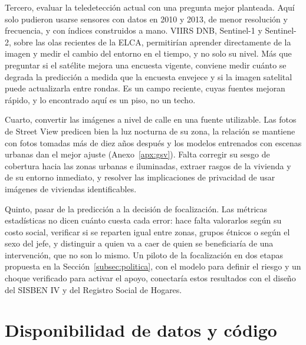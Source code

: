\documentclass[12pt, letterpaper]{article}
\begin{document}
Tercero, evaluar la teledetección actual con una pregunta mejor planteada.
Aquí solo pudieron usarse sensores con datos en 2010 y 2013, de menor
resolución y frecuencia, y con índices construidos a mano. VIIRS DNB,
Sentinel-1 y Sentinel-2, sobre las olas recientes de la ELCA, permitirían
aprender directamente de la imagen y medir el cambio del entorno en el
tiempo, y no solo su nivel. Más que preguntar si el satélite mejora una
encuesta vigente, conviene medir cuánto se degrada la predicción a medida
que la encuesta envejece y si la imagen satelital puede actualizarla entre
rondas. Es un campo reciente, cuyas fuentes mejoran rápido, y lo
encontrado aquí es un piso, no un techo.

Cuarto, convertir las imágenes a nivel de calle en una fuente utilizable.
Las fotos de Street View predicen bien la luz nocturna de su zona, la
relación se mantiene con fotos tomadas más de diez años después y los
modelos entrenados con escenas urbanas dan el mejor ajuste
(Anexo~\ref{apx:gsv}). Falta corregir su sesgo de cobertura hacia las
zonas urbanas e iluminadas, extraer rasgos de la vivienda y de su entorno
inmediato, y resolver las implicaciones de privacidad de usar imágenes de
viviendas identificables.

Quinto, pasar de la predicción a la decisión de focalización. Las métricas
estadísticas no dicen cuánto cuesta cada error: hace falta valorarlos
según su costo social, verificar si se reparten igual entre zonas, grupos
étnicos o según el sexo del jefe, y distinguir a quien va a caer de quien
se beneficiaría de una intervención, que no son lo mismo. Un piloto de la
focalización en dos etapas propuesta en la Sección~\ref{subsec:politica},
con el modelo para definir el riesgo y un choque verificado para activar
el apoyo, conectaría estos resultados con el diseño del SISBEN IV y del
Registro Social de Hogares.

\section*{Disponibilidad de datos y código}
\label{sec:disponibilidad}
\end{document}
